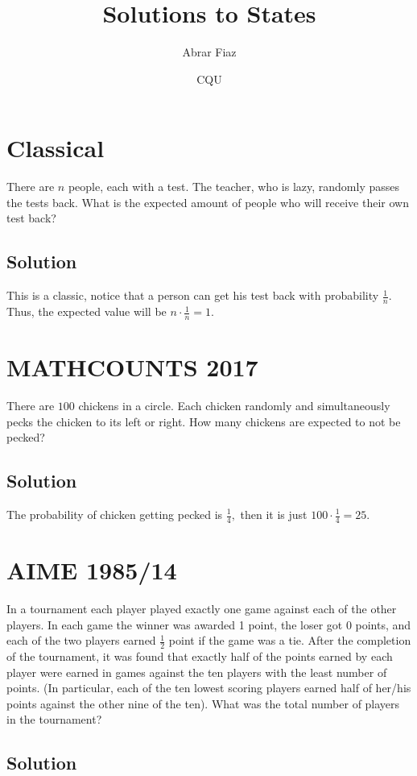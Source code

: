 \documentclass[mast]{lucky}
\title{Solutions to States}
\author{Abrar Fiaz}
\date{CQU}
\begin{document}
\maketitle

\toc


\pagebreak\section{Classical} 
There are $n$ people, each with a test. The teacher, who is lazy, randomly passes the tests back. What is the expected amount of people who will receive their own test back?
\subsection{Solution}
This is a classic, notice that a person can get his test back with probability $\frac1n$. Thus, the expected value will be $n\cdot\frac1n = 1.$ 
	


\pagebreak\section{MATHCOUNTS 2017} There are $100$ chickens in a circle. Each chicken randomly and simultaneously pecks the chicken to its left or right. How many chickens are expected to not be pecked?
\subsection{Solution}
The probability of chicken getting pecked is $\frac14,$ then it is just $100\cdot\frac14=25.$



\pagebreak\section{AIME 1985/14} In a tournament each player played exactly one game against each of the other players. In each game the winner was awarded 1 point, the loser got 0 points, and each of the two players earned $\frac{1}{2}$ point if the game was a tie. After the completion of the tournament, it was found that exactly half of the points earned by each player were earned in games against the ten players with the least number of points. (In particular, each of the ten lowest scoring players earned half of her/his points against the other nine of the ten). What was the total number of players in the tournament?
\subsection{Solution}
\end{document}
